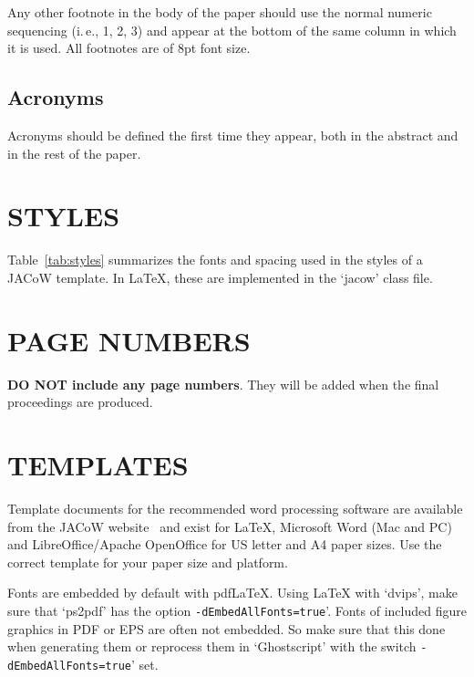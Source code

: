 \documentclass[a4paper,
               keeplastbox,   %
               ]{jacow}
\begin{document}
Any other footnote in the body of the paper should
use the normal numeric sequencing (i.\,e., 1, 2, 3)
and appear at the bottom of the same column in which
it is used.  All footnotes are of 8pt font size.

\subsection{Acronyms}

Acronyms should be defined the first time they appear, 
both in the abstract and in the rest of the paper. 

\section{STYLES}

Table~\ref{tab:styles} summarizes the fonts and spacing used in the styles of
a JACoW template. In \LaTeX, these 
are implemented in the ‘jacow’ class file.

\section{PAGE NUMBERS}

\textbf{DO NOT include any page numbers}. They will be added
when the final proceedings are produced.

\section{TEMPLATES}

Template documents for the recommended word processing
software are available from the JACoW website~\cite{jacow-help}
and exist for \LaTeX, Microsoft Word (Mac and PC)
and LibreOffice/Apache OpenOffice for US letter and A4
paper sizes. Use the correct template for your paper size and
platform.

Fonts are embedded by default with pdf\LaTeX. Using \LaTeX{} with `dvips', 
make sure that `ps2pdf' has the option \texttt{-dEmbedAllFonts=true}'.
Fonts of included figure graphics in PDF or EPS are often not embedded. 
So make sure that this done when generating them or reprocess them 
in `Ghostscript' with the switch \texttt{-dEmbedAllFonts=true}' set.

\flushcolsend
\end{document}
